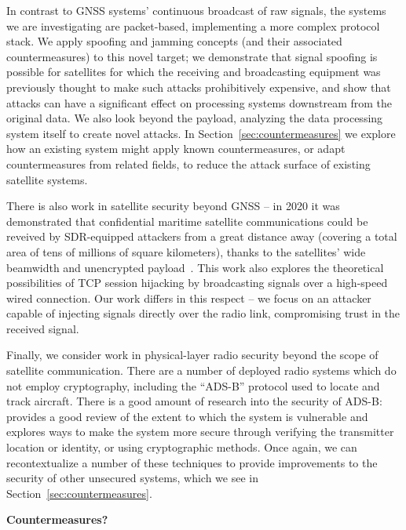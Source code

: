 In contrast to GNSS systems' continuous broadcast of raw signals, the systems we are investigating are packet-based, implementing a more complex protocol stack.
We apply spoofing and jamming concepts (and their associated countermeasures) to this novel target; we demonstrate that signal spoofing is possible for satellites for which the receiving and broadcasting equipment was previously thought to make such attacks prohibitively expensive, and show that attacks can have a significant effect on processing systems downstream from the original data.
We also look beyond the payload, analyzing the data processing system itself to create novel attacks.
In Section~\ref{sec:countermeasures} we explore how an existing system might apply known countermeasures, or adapt countermeasures from related fields, to reduce the attack surface of existing satellite systems.

There is also work in satellite security beyond GNSS -- in 2020 it was demonstrated that confidential maritime satellite communications could be reveived by SDR-equipped attackers from a great distance away (covering a total area of tens of millions of square kilometers), thanks to the satellites' wide beamwidth and unencrypted payload~\cite{pavurTale2020}.
This work also explores the theoretical possibilities of TCP session hijacking by broadcasting signals over a high-speed wired connection.
Our work differs in this respect -- we focus on an attacker capable of injecting signals directly over the radio link, compromising trust in the received signal.

Finally, we consider work in physical-layer radio security beyond the scope of satellite communication.
There are a number of deployed radio systems which do not employ cryptography, including the ``ADS-B'' protocol used to locate and track aircraft.
There is a good amount of research into the security of ADS-B: \cite{strohmeierSecurity2015} provides a good review of the extent to which the system is vulnerable and explores ways to make the system more secure through verifying the transmitter location or identity, or using cryptographic methods.
Once again, we can recontextualize a number of these techniques to provide improvements to the security of other unsecured systems, which we see in Section~\ref{sec:countermeasures}.

\textbf{Countermeasures?}
